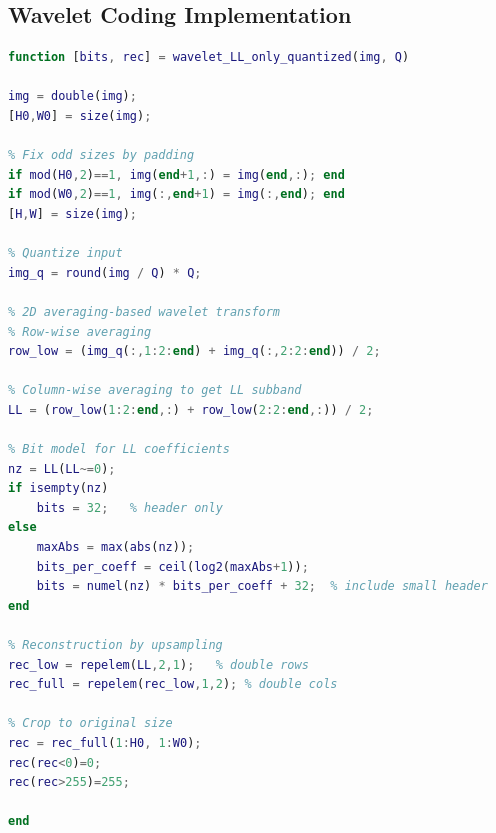 \documentclass[12pt, a4paper]{AnantDocumentation}
\begin{document}
\subsection{Wavelet Coding Implementation}
\label{subappendix:dwt-code}
\begin{lstlisting}[language=Matlab, caption={Wavelet Coding (LL-only) Implementation}, label={lst:dwt-code}]
function [bits, rec] = wavelet_LL_only_quantized(img, Q)

img = double(img);
[H0,W0] = size(img);

% Fix odd sizes by padding
if mod(H0,2)==1, img(end+1,:) = img(end,:); end
if mod(W0,2)==1, img(:,end+1) = img(:,end); end
[H,W] = size(img);

% Quantize input
img_q = round(img / Q) * Q;

% 2D averaging-based wavelet transform
% Row-wise averaging
row_low = (img_q(:,1:2:end) + img_q(:,2:2:end)) / 2;

% Column-wise averaging to get LL subband
LL = (row_low(1:2:end,:) + row_low(2:2:end,:)) / 2;

% Bit model for LL coefficients
nz = LL(LL~=0);
if isempty(nz)
    bits = 32;   % header only
else
    maxAbs = max(abs(nz));
    bits_per_coeff = ceil(log2(maxAbs+1));
    bits = numel(nz) * bits_per_coeff + 32;  % include small header
end

% Reconstruction by upsampling
rec_low = repelem(LL,2,1);   % double rows
rec_full = repelem(rec_low,1,2); % double cols

% Crop to original size
rec = rec_full(1:H0, 1:W0);
rec(rec<0)=0; 
rec(rec>255)=255;

end
\end{lstlisting}
\end{document}
